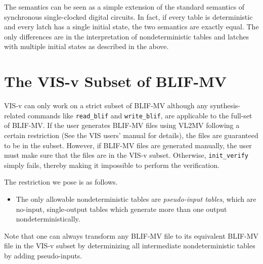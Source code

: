 The semantics can be seen as a simple extension of
the standard semantics of synchronous single-clocked
digital circuits.
In fact,
if every table is deterministic
and every latch has a single initial state,
the two semantics are exactly equal.
The only differences are in
the interpretation
of nondeterministic tables and latches with multiple initial states
as described in the above.

\section{The VIS-v Subset of BLIF-MV}
VIS-v can only work on
a strict subset of BLIF-MV
although any synthesis-related commands
like {\tt read\_blif} and {\tt write\_blif},
are
applicable to the full-set of BLIF-MV.
If the user generates BLIF-MV files using
VL2MV following a certain restriction
(See the VIS users' manual for details),
the files are guaranteed to be in the subset.
However, if BLIF-MV files are generated
manually,
the user must make sure that the files
are in the VIS-v subset.
Otherwise, {\tt init\_verify} simply fails,
thereby making it impossible to perform the verification.

The restriction we pose is as follows.
\begin{itemize}
\item The only allowable nondeterministic tables
are {\em pseudo-input tables},
which are no-input, single-output tables which generate
more than one output nondeterministically.
\end{itemize}
Note that
one can always transform
any BLIF-MV file to its equivalent BLIF-MV file
in the VIS-v subset
by determinizing all intermediate nondeterministic tables
by adding pseudo-inputs.

